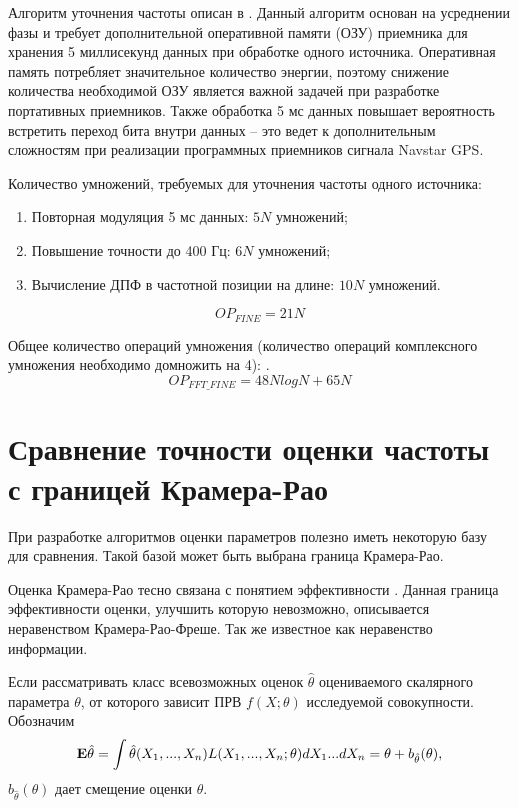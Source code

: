 Алгоритм уточнения частоты описан в \cite{tsui}. Данный алгоритм основан на усреднении фазы и требует дополнительной оперативной памяти (ОЗУ) приемника для
хранения 5 миллисекунд данных при обработке одного источника. Оперативная память потребляет значительное количество энергии, поэтому снижение количества
необходимой ОЗУ является важной задачей при разработке портативных приемников. Также обработка 5 мс данных повышает вероятность встретить переход бита
внутри данных – это ведет к дополнительным сложностям при реализации программных приемников сигнала Navstar GPS.

Количество умножений, требуемых для уточнения частоты одного источника:
\begin{enumerate}
\item Повторная модуляция 5 мс данных: ${5N}$ умножений;
\item Повышение точности до 400 Гц: ${6N}$ умножений;
\item Вычисление ДПФ в частотной позиции на длине: ${10N}$ умножений.
\end{enumerate}
\begin{equation}
	\label{eq:op_fine}
	OP_{FINE} = 21N
\end{equation}

Общее количество операций умножения (количество операций комплексного умножения необходимо домножить на 4):  .
\begin{equation}
	\label{eq:op_fine_fft}
	OP_{FFT\_FINE} = 48NlogN + 65N
\end{equation}

\section{Сравнение точности оценки частоты с границей Крамера-Рао}
При разработке алгоритмов оценки параметров полезно иметь некоторую базу для сравнения. Такой базой может быть выбрана граница Крамера-Рао.

Оценка Крамера-Рао тесно связана с понятием эффективности . Данная граница эффективности оценки, улучшить которую невозможно, описывается
неравенством Крамера-Рао-Фреше. Так же известное как неравенство информации.

Если рассматривать класс всевозможных оценок ${\hat{\theta}}$ оцениваемого скалярного параметра ${\theta}$, от которого зависит ПРВ ${f(X; \theta)}$
исследуемой совокупности. Обозначим
\begin{equation}
	\label{eq:clrb_mean}
	{\bf{E}} \hat{\theta} = \int \hat{\theta} (X_1, ..., X_n)L(X_1, ..., X_n; \theta) dX_1 ... dX_n= \theta + b_{\hat{\theta}}(\theta),
\end{equation}
${b_{\hat{\theta}}(\theta)}$ дает смещение оценки ${\theta}$.

